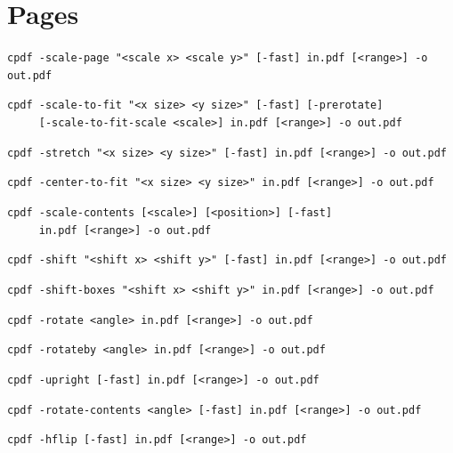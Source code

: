 \documentclass{book}
\begin{document}
\chapter{Pages}\label{chap:3}
\pagestyle{fancy}
  \label{pages}
  \begin{framed}
  \small\noindent\verb!cpdf -scale-page "<scale x> <scale y>" [-fast] in.pdf [<range>] -o out.pdf!
   
  \vspace{1.5mm}
  \small\noindent\verb!cpdf -scale-to-fit "<x size> <y size>" [-fast] [-prerotate]!\\
        \noindent\verb!     [-scale-to-fit-scale <scale>] in.pdf [<range>] -o out.pdf!

  \vspace{1.5mm}
  \small\noindent\verb!cpdf -stretch "<x size> <y size>" [-fast] in.pdf [<range>] -o out.pdf!

  \vspace{1.5mm}
  \small\noindent\verb!cpdf -center-to-fit "<x size> <y size>" in.pdf [<range>] -o out.pdf!

  \vspace{1.5mm}
  \small\noindent\verb!cpdf -scale-contents [<scale>] [<position>] [-fast]!\\
        \noindent\verb!     in.pdf [<range>] -o out.pdf!
  
  \vspace{1.5mm}
  \small\noindent\verb!cpdf -shift "<shift x> <shift y>" [-fast] in.pdf [<range>] -o out.pdf!

  \vspace{1.5mm}
  \small\noindent\verb!cpdf -shift-boxes "<shift x> <shift y>" in.pdf [<range>] -o out.pdf!

  \vspace{1.5mm}
  \small\noindent\verb!cpdf -rotate <angle> in.pdf [<range>] -o out.pdf!

  \vspace{1.5mm}
  \small\noindent\verb!cpdf -rotateby <angle> in.pdf [<range>] -o out.pdf!

  \vspace{1.5mm}
  \small\noindent\verb!cpdf -upright [-fast] in.pdf [<range>] -o out.pdf!

  \vspace{1.5mm}
  \small\noindent\verb!cpdf -rotate-contents <angle> [-fast] in.pdf [<range>] -o out.pdf!


  \vspace{1.5mm}
  \small\noindent\verb!cpdf -hflip [-fast] in.pdf [<range>] -o out.pdf!


\end{framed}
\end{document}
